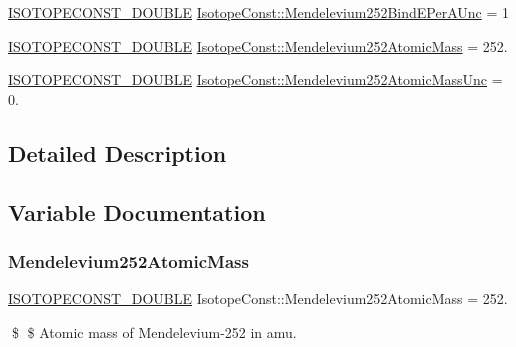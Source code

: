 \begin{DoxyCompactItemize}
\item 
\mbox{\hyperlink{group___isotope_const-_macros_ga8f45a7272ce02c0b4c65c44636ed719a}{I\+S\+O\+T\+O\+P\+E\+C\+O\+N\+S\+T\+\_\+\+D\+O\+U\+B\+LE}} \mbox{\hyperlink{group___isotope_const-_mendelevium-_md252_ga77cd242af0defb1299efc4b8e353366f}{Isotope\+Const\+::\+Mendelevium252\+Bind\+E\+Per\+A\+Unc}} = 1
\item 
\mbox{\hyperlink{group___isotope_const-_macros_ga8f45a7272ce02c0b4c65c44636ed719a}{I\+S\+O\+T\+O\+P\+E\+C\+O\+N\+S\+T\+\_\+\+D\+O\+U\+B\+LE}} \mbox{\hyperlink{group___isotope_const-_mendelevium-_md252_gafa165ccc7648ca5e8614eb860a7a17be}{Isotope\+Const\+::\+Mendelevium252\+Atomic\+Mass}} = 252.
\item 
\mbox{\hyperlink{group___isotope_const-_macros_ga8f45a7272ce02c0b4c65c44636ed719a}{I\+S\+O\+T\+O\+P\+E\+C\+O\+N\+S\+T\+\_\+\+D\+O\+U\+B\+LE}} \mbox{\hyperlink{group___isotope_const-_mendelevium-_md252_ga1fb94ea009e55335ff46773dded271bf}{Isotope\+Const\+::\+Mendelevium252\+Atomic\+Mass\+Unc}} = 0.
\end{DoxyCompactItemize}


\subsection{Detailed Description}


\subsection{Variable Documentation}
\mbox{\label{group___isotope_const-_mendelevium-_md252_gafa165ccc7648ca5e8614eb860a7a17be}} 
\subsubsection{\texorpdfstring{Mendelevium252\+Atomic\+Mass}{Mendelevium252AtomicMass}}
{\footnotesize\ttfamily \mbox{\hyperlink{group___isotope_const-_macros_ga8f45a7272ce02c0b4c65c44636ed719a}{I\+S\+O\+T\+O\+P\+E\+C\+O\+N\+S\+T\+\_\+\+D\+O\+U\+B\+LE}} Isotope\+Const\+::\+Mendelevium252\+Atomic\+Mass = 252.}

\$ \$ Atomic mass of Mendelevium-\/252 in amu. \mbox{\label{group___isotope_const-_mendelevium-_md252_ga1fb94ea009e55335ff46773dded271bf}} 
